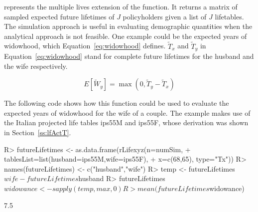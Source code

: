 \documentclass[nojss]{jss}
\begin{document}
 represents the multiple lives extension of the 
function. It returns a matrix of sampled expected future lifetimes of $J$
policyholders given a list of $J$ lifetables. The simulation approach is
useful in evaluating demographic quantities when the analytical approach is
not feasible.
One example could be the expected years of widowhood, which
Equation~\ref{eq:widowhood} defines. $\tilde T_x$ and $\tilde T_y$ in
Equation~\ref{eq:widowhood} stand for complete future lifetimes for 
the husband and the wife respectively.

\begin{equation}
E\left[ \tilde W_y \right] = \max \left( 0, \tilde T_y - \tilde T_x \right)
\label{eq:widowhood}
\end{equation}

The following code shows how this function could be used to 
evaluate the expected years of widowhood for the wife of a couple. The
example makes use of the Italian projected life tables ips55M and ips55F, whose
derivation was shown in Section~\ref{ss:lfActT}.


\begin{Schunk}
\begin{Sinput}
R> futureLifetimes <- as.data.frame(rLifexyz(n=numSim, 
+  				tablesList=list(husband=ips55M,wife=ips55F),
+  				x=c(68,65), type="Tx"))
R> names(futureLifetimes) <- c("husband","wife")
R> temp <- futureLifetimes$wife - futureLifetimes$husband
R> futureLifetimes$widowance  <-  sapply(temp, max,0)
R> mean(futureLifetimes$widowance)
\end{Sinput}
\begin{Soutput}
[1] 7.5
\end{Soutput}
\end{Schunk}
\end{document}
